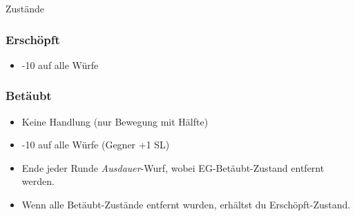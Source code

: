 \documentclass{article}
\begin{document}
\begin{multicols*}{3}

        


    \begin{slsframe}{Zustände}
        \subsubsection*{Erschöpft}
        \begin{itemize}%
            \item -10 auf alle Würfe
        \end{itemize}        

        \subsubsection*{Betäubt}
        \begin{itemize}%
            \item Keine Handlung (nur Bewegung mit Hälfte)
            \item -10 auf alle Würfe (Gegner +1 SL)
            \item Ende jeder Runde \textit{Ausdauer}-Wurf, wobei EG-Betäubt-Zustand entfernt werden.
            \item Wenn alle Betäubt-Zustände entfernt wurden, erhältst du Erschöpft-Zustand.
        \end{itemize}


\end{slsframe}
\end{multicols*}
\end{document}

